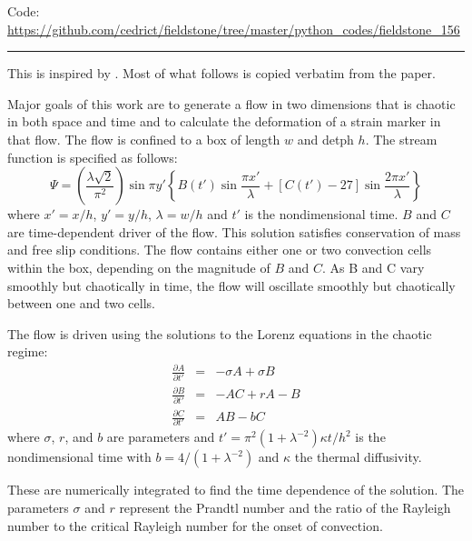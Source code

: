 \begin{center}
\inpython
{\small Code: \url{https://github.com/cedrict/fieldstone/tree/master/python_codes/fieldstone_156}}
\end{center}

\par\noindent\rule{\textwidth}{0.4pt}


This \stone is inspired by \textcite{ketu90}. Most of what follows is copied verbatim from the paper.

Major goals of this work are to generate a flow in two
dimensions that is chaotic in both space and time and
to calculate the deformation of a strain marker in that flow.
The flow is confined to a box of length $w$ and detph $h$.
The stream function is specified as follows:
\begin{equation}
\Psi = 
\left(
\frac{\lambda \sqrt 2}{\pi^2}
\right)
\sin \pi y'
\left\{
B(t') \sin \frac{\pi x'}{\lambda}
+[C(t')-27]\sin \frac{2 \pi x'}{\lambda}
\right\}
\label{eq:ketupsi}
\end{equation}
where $x'=x/h$, $y'=y/h$, $\lambda=w/h$ and $t'$ is the nondimensional
time. 
$B$ and $C$ are time-dependent driver of the flow. This solution satisfies 
conservation of mass and free slip conditions. 
The flow contains either one or two convection cells within the box,
depending on the magnitude of $B$ and $C$.
As B and C vary smoothly but chaotically in time, the flow will oscillate
smoothly but chaotically between one and two cells. 

The flow is driven using the solutions to the Lorenz equations in the chaotic regime:
\begin{eqnarray}
\frac{\partial A}{\partial t'} &=& -\sigma A + \sigma B \label{eq:Lorenz1}\\ 
\frac{\partial B}{\partial t'} &=& -AC + rA -B \label{eq:Lorenz2}\\ 
\frac{\partial C}{\partial t'} &=& AB - bC \label{eq:Lorenz3}
\end{eqnarray}
where $\sigma$, $r$, and $b$ are parameters and $t'=\pi^2 (1+\lambda^{-2}) \kappa t /h^2$
is the nondimensional time with $b=4/(1+\lambda^{-2})$ and $\kappa$ the thermal diffusivity. 

These are numerically integrated to find the time dependence of the solution. 
The parameters $\sigma$ and $r$ represent the Prandtl number  and the ratio
of the Rayleigh number to the critical Rayleigh number for the onset of convection.

